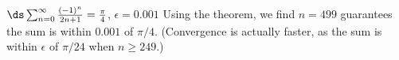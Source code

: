 {$\ds \sum_{n=0}^\infty \frac{(-1)^{n}}{2n+1}=\frac{\pi}4$, \quad $\epsilon = 0.001$
}
{Using the theorem, we find $n=499$ guarantees the sum is within $0.001$ of $\pi/4$. (Convergence is actually faster, as the sum is within $\epsilon$ of $\pi/24$ when  $n\geq 249$.)
}